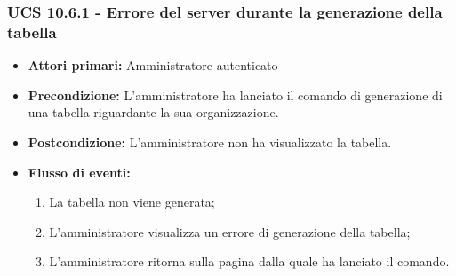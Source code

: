 \subsubsection{UCS 10.6.1 - Errore del server durante la generazione della tabella}
\begin{itemize}
    \item \textbf{Attori primari:} Amministratore autenticato
    \item \textbf{Precondizione:} L'amministratore ha lanciato il comando di generazione di una tabella riguardante la sua organizzazione.
    \item \textbf{Postcondizione:} L'amministratore non ha visualizzato la tabella.
    \item \textbf{Flusso di eventi:} \begin{enumerate}
    \item La tabella non viene generata;
    \item L'amministratore visualizza un errore di generazione della tabella;
    \item L'amministratore ritorna sulla pagina dalla quale ha lanciato il comando.
    \end{enumerate}
\end{itemize}